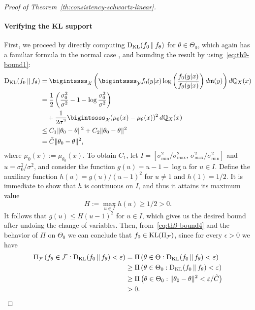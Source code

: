 \begin{proof}[Proof of Theorem~\ref{th:consistency-schwartz-linear}]
\paragraph{Verifying the KL support} First, we proceed by directly computing \(\operatorname{D_{KL}}(f_0 \,\|\, f_\theta)\) for \(\theta\in\Theta_0\), which again has a familiar formula in the normal case \citep[e.g.][p.~47]{pardo2018statistical}, and bounding the result by using~\eqref{eq:th9-bound1}:
\begin{equation}\label{eq:th9-bound4}
  \begin{split}
  \dkl(f_0 \,\|\, f_\theta) & =  \bigintssss_{\mathcal X} \left( \bigintssss_{\mathcal Y}f_0(y|x)\log\left(\frac{f_0(y|x)}{f_\theta(y|x)}\right)  d\mathfrak{m}(y)\right)d\qq_X(x)\\
  & = \frac{1}{2}\left(\frac{\sigma_0^2}{\sigma^2} - 1 - \log \frac{\sigma_0^2}{\sigma^2} \right)\\
  &\quad + \frac{1}{2\sigma^2}\bigintssss_{\mathcal X} (\mu_0(x) - \mu_\theta(x))^2\, d\qq_X(x)\\
  & \leq C_1\|\theta_0 - \theta\|^2 + C_2\|\theta_0-\theta\|^2 \\
  & = \tilde C\|\theta_0 - \theta\|^2,
  \end{split}
\end{equation}
where \(\mu_0(x) := \mu_{\theta_0}(x)\). To obtain \(C_1\), let \(I=[\sigma^2_{\text{min}}/\sigma^2_\text{max},\, \sigma^2_{\text{max}}/\sigma^2_\text{min}]\) and \(u=\sigma_0^2/\sigma^2\), and consider the function \(g(u)=u - 1 - \log u\) for \(u\in I\). Define the auxiliary function \(h(u) = g(u)/(u-1)^2\) for \(u\neq 1\) and \(h(1)=1/2\). It is immediate to show that \(h\) is continuous on \(I\), and thus it attains its maximum value
\[H :=\max_{u \in I} h(u)\geq 1/2 > 0.
\]
It follows that \(g(u) \leq H (u-1)^2\) for \(u\in I\), which gives us the desired bound after undoing the change of variables. Then, from~\eqref{eq:th9-bound4} and the behavior of \(\Pi\) on \(\Theta_0\) we can conclude that \(f_0\in\operatorname{KL}(\Pi_{\mathcal F})\), since for every \(\epsilon>0\) we have
\begin{align*}
  \Pi_{\mathcal F}\left(f_\theta\in \mathcal F: \operatorname{D_{KL}}(f_0 \,\|\, f_\theta) < \varepsilon\right) & =\Pi\left(\theta \in \Theta: \operatorname{D_{KL}}(f_0 \,\|\, f_\theta) < \varepsilon\right)      \\
  & \geq \Pi\left(\theta \in \Theta_0: \operatorname{D_{KL}}(f_0 \,\|\, f_\theta) <\varepsilon\right) \\
  & \geq \Pi\left(\theta\in\Theta_0: \|\theta_0 - \theta\|^2 < \varepsilon/\tilde C\right)\\
  & > 0.
\end{align*}
\end{proof}

